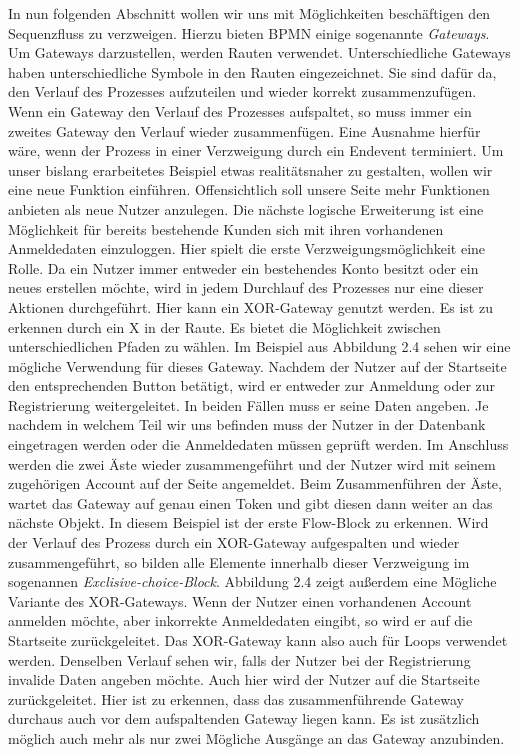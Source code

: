 In nun folgenden Abschnitt wollen wir uns mit Möglichkeiten beschäftigen den Sequenzfluss zu verzweigen. Hierzu bieten BPMN einige sogenannte \emph{Gateways}. Um Gateways darzustellen, werden Rauten verwendet. Unterschiedliche Gateways haben unterschiedliche Symbole in den Rauten eingezeichnet. Sie sind dafür da, den Verlauf des Prozesses aufzuteilen und wieder korrekt zusammenzufügen. Wenn ein Gateway den Verlauf des Prozesses aufspaltet, so muss immer ein zweites Gateway den Verlauf wieder zusammenfügen. Eine Ausnahme hierfür wäre, wenn der Prozess in einer Verzweigung durch ein Endevent terminiert.
Um unser bislang erarbeitetes Beispiel etwas realitätsnaher zu gestalten, wollen wir eine neue Funktion einführen. Offensichtlich soll unsere Seite mehr Funktionen anbieten als neue Nutzer anzulegen. Die nächste logische Erweiterung ist eine Möglichkeit für bereits bestehende Kunden sich mit ihren vorhandenen Anmeldedaten einzuloggen. Hier spielt die erste Verzweigungsmöglichkeit eine Rolle. Da ein Nutzer immer entweder ein bestehendes Konto besitzt oder ein neues erstellen möchte, wird in jedem Durchlauf des Prozesses nur eine dieser Aktionen durchgeführt. Hier kann ein XOR-Gateway genutzt werden. Es ist zu erkennen durch ein X in der Raute. Es bietet die Möglichkeit zwischen unterschiedlichen Pfaden zu wählen. Im Beispiel aus Abbildung 2.4 sehen wir eine mögliche Verwendung für dieses Gateway. Nachdem der Nutzer auf der Startseite den entsprechenden Button betätigt, wird er entweder zur Anmeldung oder zur Registrierung weitergeleitet. In beiden Fällen muss er seine Daten angeben. Je nachdem in welchem Teil wir uns befinden muss der Nutzer in der Datenbank eingetragen werden oder die Anmeldedaten müssen geprüft werden. Im Anschluss werden die zwei Äste wieder zusammengeführt und der Nutzer wird mit seinem zugehörigen Account auf der Seite angemeldet. Beim Zusammenführen der Äste, wartet das Gateway auf genau einen Token und gibt diesen dann weiter an das nächste Objekt. In diesem Beispiel ist der erste Flow-Block zu erkennen. Wird der Verlauf des Prozess durch ein XOR-Gateway aufgespalten und wieder zusammengeführt, so bilden alle Elemente innerhalb dieser Verzweigung im sogenannen \emph{Exclisive-choice-Block}. Abbildung 2.4 zeigt außerdem eine Mögliche Variante des XOR-Gateways. Wenn der Nutzer einen vorhandenen Account anmelden möchte, aber inkorrekte Anmeldedaten eingibt, so wird er auf die Startseite zurückgeleitet. Das XOR-Gateway kann also auch für Loops verwendet werden. Denselben Verlauf sehen wir, falls der Nutzer bei der Registrierung invalide Daten angeben möchte. Auch hier wird der Nutzer auf die Startseite zurückgeleitet. Hier ist zu erkennen, dass das zusammenführende Gateway durchaus auch vor dem aufspaltenden Gateway liegen kann. Es ist zusätzlich möglich auch mehr als nur zwei Mögliche Ausgänge an das Gateway anzubinden. 



